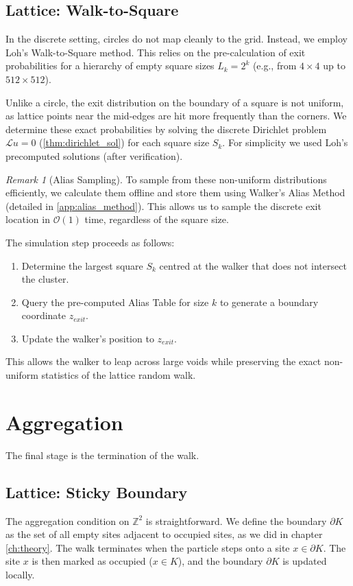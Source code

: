 \documentclass[12pt, a4paper, oneside]{report}
\theoremstyle{remark}
\newtheorem{remark}[theorem]{Remark}
\begin{document}
\subsection{Lattice: Walk-to-Square}
In the discrete setting, circles do not map cleanly to the grid. Instead, we employ Loh's Walk-to-Square method. This relies on the pre-calculation of exit probabilities for a hierarchy of empty square sizes $L_k = 2^k$ (e.g., from $4 \times 4$ up to $512 \times 512$).

Unlike a circle, the exit distribution on the boundary of a square is not uniform, as lattice points near the mid-edges are hit more frequently than the corners. We determine these exact probabilities by solving the discrete Dirichlet problem $\mathcal{L}u = 0$ (\cref{thm:dirichlet_sol}) for each square size $S_k$. For simplicity we used Loh's precomputed solutions (after verification).

\begin{remark}[Alias Sampling]
To sample from these non-uniform distributions efficiently, we calculate them offline and store them using Walker's Alias Method (detailed in \cref{app:alias_method}). This allows us to sample the discrete exit location in $\mathcal{O}(1)$ time, regardless of the square size.
\end{remark}

The simulation step proceeds as follows:
\begin{enumerate}
    \item Determine the largest square $S_k$ centred at the walker that does not intersect the cluster.
    \item Query the pre-computed Alias Table for size $k$ to generate a boundary coordinate $z_{exit}$.
    \item Update the walker's position to $z_{exit}$.
\end{enumerate}
This allows the walker to leap across large voids while preserving the exact non-uniform statistics of the lattice random walk.


\section{Aggregation}
\label{sec:aggregation}
The final stage is the termination of the walk.

\subsection{Lattice: Sticky Boundary}
The aggregation condition on $\mathbb{Z}^2$ is straightforward. We define the boundary $\partial K$ as the set of all empty sites adjacent to occupied sites, as we did in chapter \cref{ch:theory}. The walk terminates when the particle steps onto a site $x \in \partial K$. The site $x$ is then marked as occupied ($x \in K$), and the boundary $\partial K$ is updated locally.
\end{document}
